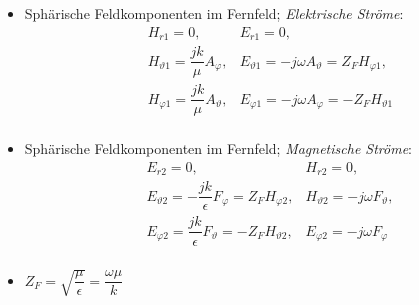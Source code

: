 {\begin{itemize}
\begin{align*}
\begin{cases}
                    \vec{E}(\vec{r}) \approx \dfrac{jk}{\epsilon}\vec{e}_r\times\vec{F}(\vec{r})
                \end{cases}
            \end{align*}
        \item Sphärische Feldkomponenten im Fernfeld; \textit{Elektrische Ströme}:
            \begin{align*}
                &H_{r1}=0, &E_{r1}=0,\\
                &H_{\vartheta1}=\dfrac{jk}{\mu}A_{\varphi}, &E_{\vartheta1}=-j\omega A_{\vartheta}=Z_F H_{\varphi1},\\
                &H_{\varphi1}=\dfrac{jk}{\mu}A_{\vartheta}, &E_{\varphi1}=-j\omega A_{\varphi}=-Z_F H_{\vartheta1}\\
            \end{align*}
        \item Sphärische Feldkomponenten im Fernfeld; \textit{Magnetische Ströme}:
            \begin{align*}
                &E_{r2}=0, &H_{r2}=0,\\
                &E_{\vartheta2}=-\dfrac{jk}{\epsilon}F_{\varphi}=Z_F H_{\varphi2}, &H_{\vartheta2}=-j\omega F_{\vartheta},\\
                &E_{\varphi2}=\dfrac{jk}{\epsilon}F_{\vartheta}=-Z_F H_{\vartheta2}, &E_{\varphi2}=-j\omega F_{\varphi}\\
            \end{align*}
        \item \(Z_F = \sqrt{\dfrac{\mu}{\epsilon}} = \dfrac{\omega\mu}{k}\)
\end{itemize}
}
